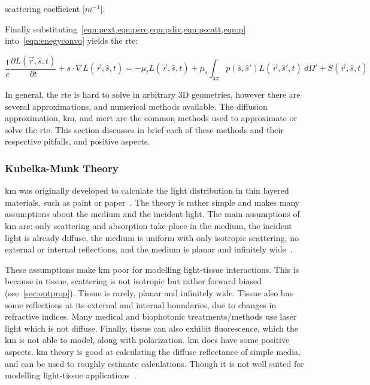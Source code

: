 \indent scattering coefficient [$m^{-1}$].

\medskip


Finally substituting~\cref{eqn:pext,eqn:psrc,eqn:pdiv,eqn:pscatt,eqn:p} into~\cref{eqn:enegyconvo} yields the \gls*{rte}:

\begin{equation}
\frac{1}{c}\frac{\partial L(\vec{r},\hat{s},t)}{\partial t} + s\cdot \nabla L(\vec{r},\hat{s},t)=-\mu_tL(\vec{r},\hat{s},t)+\mu_s\int_{4\pi}p(\hat{s},\hat{s}')L(\vec{r},\hat{s}',t)\ d\Omega' + S(\vec{r},\hat{s},t)
\label{eqn:rte}
\end{equation}


In general, the \gls*{rte} is hard to solve in arbitrary 3D geometries, however there are several approximations, and numerical methods available. The diffusion approximation, \gls*{km}, and \gls*{mcrt} are the common methods used to approximate or solve the \gls*{rte}.
This section discusses in brief each of these methods and their respective pitfalls, and positive aspects.

\subsubsection*{Kubelka-Munk Theory}
\gls*{km} was originally developed to calculate the light distribution in thin layered materials, such as paint or paper~\cite{barbaric2011kubelka}. The theory is rather simple and makes many assumptions about the medium and the incident light. The main assumptions of \gls*{km} are: only scattering and absorption take place in the medium, the incident light is already diffuse, the medium is uniform with only isotropic scattering, no external or internal reflections, and the medium is planar and infinitely wide~\cite{jasinski2011modelling,cheong1990review,gabriela2013mathematical}.

These assumptions make \gls*{km} poor for modelling light-tissue interactions.
This is because in tissue, scattering is not isotropic but rather forward biased (see~\cref{sec:optprop}). 
Tissue is rarely, planar and infinitely wide. 
Tissue also has some reflections at its external and internal boundaries, due to changes in refractive indices. 
Many medical and biophotonic treatments/methods use laser light which is not diffuse. Finally, tissue can also exhibit fluorescence, which the \gls*{km} is not able to model, along with polarization. 
\gls*{km} does have some positive aspects.
\Gls*{km} theory is good at calculating the diffuse reflectance of simple media, and can be used to roughly estimate calculations. Though it is not well suited for modelling light-tissue applications~\cite{prahl1990light}.

